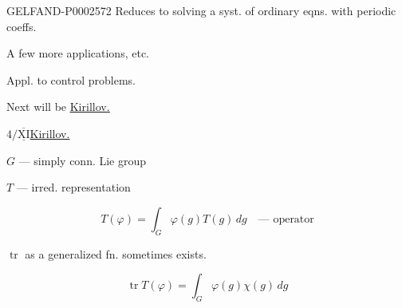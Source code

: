 \begin{GelfandAdjacentEvidence}{GELFAND-P000257}{2}
Reduces to solving a syst. of ordinary eqns. with periodic coeffs.





\end{GelfandAdjacentEvidence}


A few more applications, etc.

Appl. to control problems.

Next will be \underline{\underline{Kirillov.}}





\medskip $4/\overline{\underline{\mathrm{XI}}}$\qquad\underline{Kirillov.}

$G$ --- simply conn. Lie group

$T$ --- irred. representation





\begin{equation*}
T (\varphi)=\int_G\varphi (g)T (g)\, dg\quad\text{--- operator}
\end{equation*}





$\operatorname{tr}$ as a generalized fn. sometimes exists.





\begin{equation*}
\operatorname{tr}T (\varphi)=\int_G\varphi (g)\chi (g)\, dg
\end{equation*}

